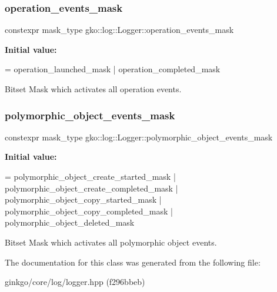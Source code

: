 \mbox{\label{classgko_1_1log_1_1Logger_a179f3d3ac86782922cbc63e33272840a}} 
\subsubsection{\texorpdfstring{operation\+\_\+events\+\_\+mask}{operation\_events\_mask}}
{\footnotesize\ttfamily constexpr mask\+\_\+type gko\+::log\+::\+Logger\+::operation\+\_\+events\+\_\+mask\hspace{0.3cm}{\ttfamily [static]}}

{\bfseries Initial value\+:}
\begin{DoxyCode}
=
        operation\_launched\_mask | operation\_completed\_mask
\end{DoxyCode}


Bitset Mask which activates all operation events. 

\mbox{\label{classgko_1_1log_1_1Logger_a5fb997f1c06c0602103d8dab616a96bc}} 
\subsubsection{\texorpdfstring{polymorphic\+\_\+object\+\_\+events\+\_\+mask}{polymorphic\_object\_events\_mask}}
{\footnotesize\ttfamily constexpr mask\+\_\+type gko\+::log\+::\+Logger\+::polymorphic\+\_\+object\+\_\+events\+\_\+mask\hspace{0.3cm}{\ttfamily [static]}}

{\bfseries Initial value\+:}
\begin{DoxyCode}
=
        polymorphic\_object\_create\_started\_mask |
        polymorphic\_object\_create\_completed\_mask |
        polymorphic\_object\_copy\_started\_mask |
        polymorphic\_object\_copy\_completed\_mask |
        polymorphic\_object\_deleted\_mask
\end{DoxyCode}


Bitset Mask which activates all polymorphic object events. 



The documentation for this class was generated from the following file\+:\begin{DoxyCompactItemize}
\item 
ginkgo/core/log/logger.\+hpp (f296bbeb)\end{DoxyCompactItemize}
